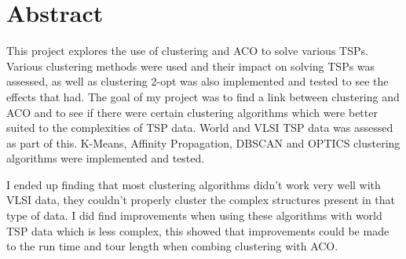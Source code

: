 \thispagestyle{empty}


\section*{\centering Abstract}


This project explores the use of clustering and ACO to solve various TSPs. Various clustering methods were used and their impact on solving TSPs was assessed, as well as clustering 2-opt was also implemented and tested to see the effects that had. The goal of my project was to find a link between clustering and ACO and to see if there were certain clustering algorithms which were better suited to the complexities of TSP data. World and VLSI TSP data was assessed as part of this. K-Means, Affinity Propagation, DBSCAN and OPTICS clustering algorithms were implemented and tested.

I ended up finding that most clustering algorithms didn't work very well with VLSI data, they couldn't properly cluster the complex structures present in that type of data. I did find improvements when using these algorithms with world TSP data which is less complex, this showed that improvements could be made to the run time and tour length when combing clustering with ACO.

